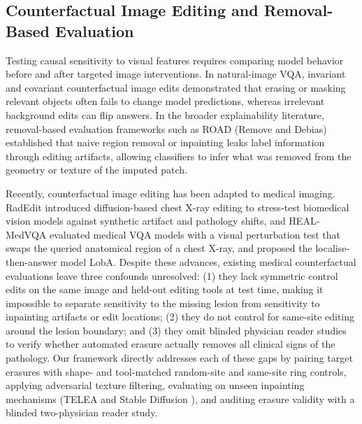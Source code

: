 \documentclass{article} %
\begin{document}
\subsection{Counterfactual Image Editing and Removal-Based Evaluation}
\label{subsec:rw_counterfactual}
Testing causal sensitivity to visual features requires comparing model behavior before and after targeted image interventions. In natural-image VQA, invariant and covariant counterfactual image edits \citep{agarwal2020towards} demonstrated that erasing or masking relevant objects often fails to change model predictions, whereas irrelevant background edits can flip answers. In the broader explainability literature, removal-based evaluation frameworks such as ROAD (Remove and Debias) \citep{rong2022road} established that naive region removal or inpainting leaks label information through editing artifacts, allowing classifiers to infer what was removed from the geometry or texture of the imputed patch.

Recently, counterfactual image editing has been adapted to medical imaging. RadEdit \citep{perez2024radedit} introduced diffusion-based chest X-ray editing to stress-test biomedical vision models against synthetic artifact and pathology shifts, and HEAL-MedVQA \citep{healmedvqa2024} evaluated medical VQA models with a visual perturbation test that swaps the queried anatomical region of a chest X-ray, and proposed the localise-then-answer model LobA. Despite these advances, existing medical counterfactual evaluations leave three confounds unresolved: (1) they lack symmetric control edits on the same image and held-out editing tools at test time, making it impossible to separate sensitivity to the missing lesion from sensitivity to inpainting artifacts or edit locations; (2) they do not control for same-site editing around the lesion boundary; and (3) they omit blinded physician reader studies to verify whether automated erasure actually removes all clinical signs of the pathology. Our framework directly addresses each of these gaps by pairing target erasures with shape- and tool-matched random-site and same-site ring controls, applying adversarial texture filtering, evaluating on unseen inpainting mechanisms (TELEA \citep{telea2004image} and Stable Diffusion \citep{rombach2022high}), and auditing erasure validity with a blinded two-physician reader study.
\end{document}
